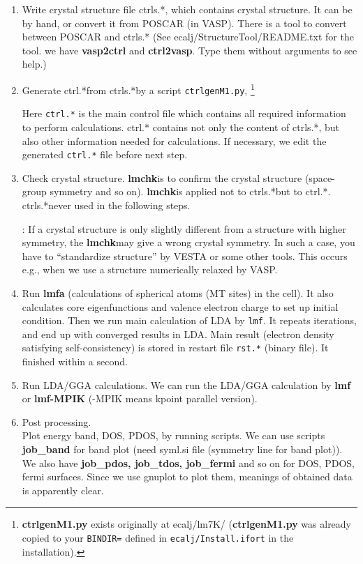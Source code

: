 \documentclass[a4paper,10pt,epsf,fleqn]{article}
\newcommand{\exe}[1]{{\bf #1}}
\newcommand{\io}[1]{{\sf  #1}}
\newcommand{\lmchk}{{\exe{lmchk}\space }}
\newcommand{\ctrl}{{\io{ctrl.*}\space }}
\newcommand{\ctrls}{{\io{ctrls.*}\space }}
\begin{document}
\begin{enumerate}
\item Write crystal structure file \ctrls, which contains crystal structure.
  It can be by hand, or convert it from POSCAR (in VASP). There
  is a tool to convert between POSCAR and \ctrls
  (See \io{ecalj/StructureTool/README.txt} for the tool.
  we have \exe{vasp2ctrl} and \exe{ctrl2vasp}. Type them without
      arguments to see help.)

\item Generate \ctrl from \ctrls by a script \verb+ctrlgenM1.py+,
      \footnote{\exe{ctrlgenM1.py} exists originally at \io{ecalj/lm7K/}
       (\exe{ctrlgenM1.py} was already copied to your 
       {\tt BINDIR=} defined in {\tt ecalj/Install.ifort} in the installation).}
 
     Here \verb+ctrl.*+ is the main control file which contains all required
     information to perform calculations. \io{ctrl.*} contains not only
      the content of \ctrls, but also other information 
     needed for calculations.
     If necessary, we edit the generated \verb+ctrl.*+ file before next step.

\item
     Check crystal structure. \lmchk is to confirm the crystal structure
     (space-group symmetry and so on). \lmchk is applied not to
     \ctrls but to \ctrl. \ctrls never used in the following steps.

     :
      If a crystal structure is only slightly different from a
     structure with higher symmetry, the \lmchk may give a wrong crystal
     symmetry. In such a case, you have to ``standardize structure'' by
     VESTA or some other tools. This occurs e.g., when we use a structure
     numerically relaxed by VASP.

\item Run \exe{lmfa} (calculations of spherical atoms (MT sites) in the cell). 
       It also calculates core eigenfunctions and valence electron charge
      to set up initial condition. Then we run main calculation of LDA by \verb+lmf+.
      It repeats iterations, and end up with converged results in LDA. Main result
      (electron density satisfying self-consistency) is stored in
      restart file \verb+rst.*+ (binary file).
      It finished within a second.

\item Run LDA/GGA calculations. 
      We can run the LDA/GGA calculation by \exe{lmf} or \exe{lmf-MPIK}
      (-MPIK means kpoint parallel version).

\item Post processing.\\
      Plot energy band, DOS, PDOS, by running scripts.
      We can use scripts \exe{job\_band} for 
      band plot (need \io{syml.si} file (symmetry line for band plot)).
      We also have \exe{job\_pdos, job\_tdos, job\_fermi} and so on for
      DOS, PDOS, fermi surfaces. 
      Since we use gnuplot to plot them, meanings of obtained data is
      apparently clear.

\end{enumerate}
\end{document}
